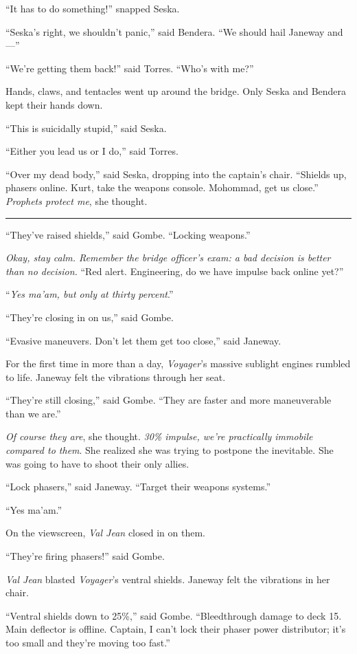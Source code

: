 \documentclass[twoside,letterpaper,12pt]{memoir}
\begin{document}
``It has to do something!'' snapped Seska.

``Seska’s right, we shouldn’t panic,'' said Bendera. ``We should hail Janeway and—''

``We're getting them back!'' said Torres. ``Who's with me?''

Hands, claws, and tentacles went up around the bridge. Only Seska and Bendera kept their hands down.

``This is suicidally stupid,'' said Seska.

``Either you lead us or I do,'' said Torres.

``Over my dead body,'' said Seska, dropping into the captain's chair. ``Shields up, phasers online. Kurt, take the weapons console. Mohommad, get us close.'' \textit{Prophets protect me}, she thought.

\fancybreak{\rule{3cm}{0.4 pt}}
\noindent``They've raised shields,'' said Gombe. ``Locking weapons.''

\textit{Okay, stay calm. Remember the bridge officer's exam: a bad decision is better than no decision.} ``Red alert. Engineering, do we have impulse back online yet?''

``\textit{Yes ma'am, but only at thirty percent}.''

``They're closing in on us,'' said Gombe.

``Evasive maneuvers. Don't let them get too close,'' said Janeway.

For the first time in more than a day, \textit{Voyager}'s massive sublight engines rumbled to life. Janeway felt the vibrations through her seat.

``They're still closing,'' said Gombe. ``They are faster and more maneuverable than we are.''

\textit{Of course they are}, she thought. \textit{30\% impulse, we're practically immobile compared to them}. She realized she was trying to postpone the inevitable. She was going to have to shoot their only allies.

``Lock phasers,'' said Janeway. ``Target their weapons systems.''

``Yes ma'am.''

On the viewscreen, \textit{Val Jean} closed in on them.

``They're firing phasers!'' said Gombe.

\textit{Val Jean} blasted \textit{Voyager}'s ventral shields. Janeway felt the vibrations in her chair.

``Ventral shields down to 25\%,'' said Gombe. ``Bleedthrough damage to deck 15. Main deflector is offline. Captain, I can't lock their phaser power distributor; it’s too small and they’re moving too fast.''
\end{document}
